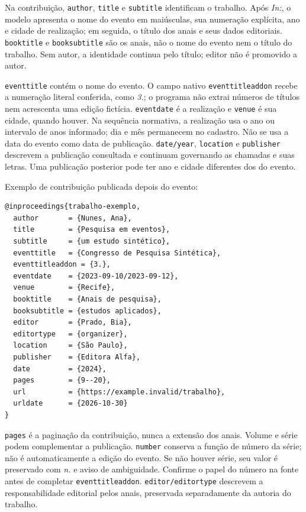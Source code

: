 Na contribuição, \texttt{author}, \texttt{title} e \texttt{subtitle} identificam
o trabalho. Após \emph{In:}, o modelo apresenta o nome do evento em maiúsculas,
sua numeração explícita, ano e cidade de realização; em seguida, o título dos
anais e seus dados editoriais. \texttt{booktitle} e \texttt{booksubtitle} são
os anais, não o nome do evento nem o título do trabalho. Sem autor, a identidade
continua pelo título; editor não é promovido a autor.

\texttt{eventtitle} contém o nome do evento. O campo nativo
\texttt{eventtitleaddon} recebe a numeração literal conferida, como \emph{3.};
o programa não extrai números de títulos nem acrescenta uma edição fictícia.
\texttt{eventdate} é a realização e \texttt{venue} é sua cidade, quando houver.
Na sequência normativa, a realização usa o ano ou intervalo de anos informado;
dia e mês permanecem no cadastro. Não se usa a data do evento como data de
publicação. \texttt{date/year}, \texttt{location} e \texttt{publisher} descrevem
a publicação consultada e continuam governando as chamadas e suas letras.
Uma publicação posterior pode ter ano e cidade diferentes dos do evento.

\begin{samepage}
Exemplo de contribuição publicada depois do evento:
\begin{verbatim}
@inproceedings{trabalho-exemplo,
  author       = {Nunes, Ana},
  title        = {Pesquisa em eventos},
  subtitle     = {um estudo sintético},
  eventtitle   = {Congresso de Pesquisa Sintética},
  eventtitleaddon = {3.},
  eventdate    = {2023-09-10/2023-09-12},
  venue        = {Recife},
  booktitle    = {Anais de pesquisa},
  booksubtitle = {estudos aplicados},
  editor       = {Prado, Bia},
  editortype   = {organizer},
  location     = {São Paulo},
  publisher    = {Editora Alfa},
  date         = {2024},
  pages        = {9--20},
  url          = {https://example.invalid/trabalho},
  urldate      = {2026-10-30}
}
\end{verbatim}
\end{samepage}

\texttt{pages} é a paginação da contribuição, nunca a extensão dos anais.
Volume e série podem complementar a publicação. \texttt{number} conserva a
função de número da série; não é automaticamente a edição do evento.
Se não houver série, seu valor é preservado com \emph{n.} e aviso de ambiguidade.
Confirme o papel do número na fonte antes de completar
\texttt{eventtitleaddon}. \texttt{editor/editortype} descrevem a responsabilidade
editorial pelos anais, preservada separadamente da autoria do trabalho.

